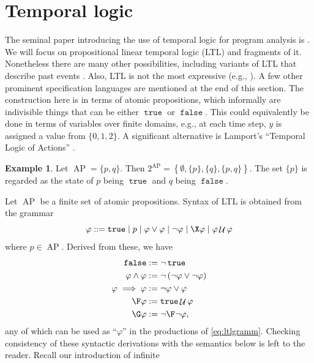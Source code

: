 \documentclass{amsart}
\DeclareMathOperator{\U}{\mathcal{U}}
\DeclareMathOperator{\ap}{AP}
\DeclareMathOperator{\true}{\mathtt{true}}
\DeclareMathOperator{\false}{\mathtt{false}}
\theoremstyle{plain}
\theoremstyle{definition}
\theoremstyle{definition}
\newtheorem{examp}{Example}
\begin{document}


\section{Temporal logic}\label{sec:tl}

The seminal paper introducing the use of temporal logic for program analysis is
\cite{Pnueli1977}.  We will focus on propositional linear temporal logic (LTL)
and fragments of it.  Nonetheless there are many other possibilities, including
variants of LTL that describe past events \cite{Emerson1990}. Also, LTL is not
the most expressive (e.g., \cite{Wolper1983}).  A few other prominent
specification languages are mentioned at the end of this section.  The
construction here is in terms of atomic propositions, which informally are
indivisible things that can be either $\true$ or $\false$.  This could
equivalently be done in terms of variables over finite domains, e.g., at each
time step, $y$ is assigned a value from $\{0,1,2\}$.  A significant alternative
is Lamport's ``Temporal Logic of Actions'' \cite{Lamport1994}.
\begin{examp}
Let $\ap = \{ p, q \}$.  Then $2^{\ap} = \left\{ \emptyset, \{p\}, \{q\} ,
\{p,q\}\right\}$.  The set $\{ p \}$ is regarded as the state of $p$ being
$\true$ and $q$ being $\false$.
\end{examp}
Let $\ap$ be a finite set of atomic propositions.  Syntax of LTL is obtained
from the grammar
\begin{equation}\label{eq:ltlgramm}
\varphi ::= \true \mid p \mid \varphi \vee \varphi \mid \neg \varphi \mid \X \varphi \mid \varphi \U \varphi
\end{equation}
where $p\in\ap$.  Derived from these, we have
\begin{align*}
\false & := \neg \true \\
\varphi \wedge \varphi & := \neg \left( \neg \varphi \vee \neg \varphi \right ) \\
\varphi \implies \varphi & := \neg \varphi \vee \varphi \\
\F \varphi & := \true \U \varphi \\
\G \varphi & := \neg \F \neg \varphi ,
\end{align*}
any of which can be used as ``$\varphi$'' in the productions of
\eqref{eq:ltlgramm}.  Checking consistency of these syntactic derivations with
the semantics below is left to the reader.  Recall our introduction of infinite
\end{document}
